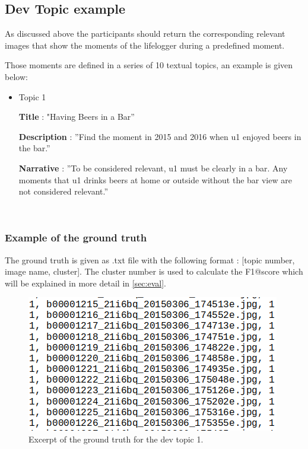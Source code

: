     \newpage
    \subsection{Dev Topic example}
    \label{sec:devtopic1}
    As discussed above the participants should return the corresponding relevant images that show the moments of the lifelogger during a predefined moment. 
    
    Those moments are defined in a series of 10 textual topics, an example is given below:


    \begin{itemize}
        \item Topic 1 
        
        \textbf{Title} : "Having Beers in a Bar”

        \textbf{Description} : ”Find the moment in 2015 and 2016 when u1 enjoyed beers in the bar.”

        \textbf{Narrative} : ”To be considered relevant, u1 must be clearly in a bar. Any moments that u1 drinks beers at home or outside without the bar view are not considered relevant.”
        


    \end{itemize}
    

    \
    \subsubsection{Example of the ground truth}


    The ground truth is given as .txt file with the following format : [topic number, image name, cluster].
    The cluster number is used to calculate the F1@score which will be explained in more detail in \ref{sec:eval}.


    \begin{figure}[htb]
        
        \centering
        \includegraphics[scale = 0.55]{Sections/5ImageClef/images/gt_t1.png}
        \caption{Excerpt of the ground truth for the dev topic 1.}  
        \label{fig:gt}
    \end{figure}



